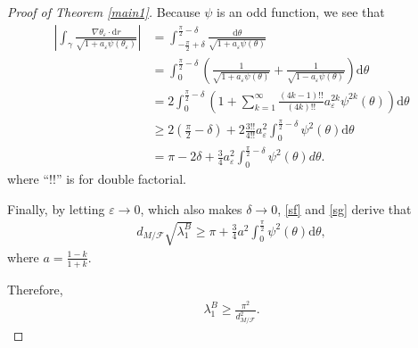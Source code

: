 \documentclass[10pt,a4paper]{amsart}
\def\d{\mathrm{d}}
\begin{document}
\begin{proof}[Proof of Theorem \ref{main1}]
        Because $\psi$ is an odd function, we see that
        \begin{align}\label{sg}
            \left\vert\int_\gamma{\frac{\nabla\theta_\varepsilon\cdot \d r}{\sqrt{1+a_\varepsilon\psi(\theta_\varepsilon)}}}\right\vert&=\int_{-\frac{\pi}{2}+\delta}^{\frac{\pi}{2}-\delta}{\frac{\d\theta}{\sqrt{1+a_\varepsilon\psi(\theta)}}}\nonumber\\&=\int_{0}^{\frac{\pi}{2}-\delta
            }\left(\frac{1}{\sqrt{1+a_\varepsilon\psi(\theta)}}+\frac{1}{\sqrt{1-a_\varepsilon\psi(\theta)}}\right)\d\theta\nonumber\\&=2\int_0^{\frac{\pi}{2}-\delta}\left(1+\sum_{k=1}^{\infty}{\frac{(4k-1)!!}{(4k)!!}a_\varepsilon^{2k}\psi^{2k}(\theta)}\right)\d\theta\\&\geq 2\left(\frac{\pi}{2}-\delta\right)+2\frac{3!!}{4!!}a_\varepsilon^2\int_0^{\frac{\pi}{2}-\delta}\psi^2(\theta)\d\theta\nonumber\\&=\pi-2\delta+\frac{3}{4}a_\varepsilon^2\int_0^{\frac{\pi}{2}-\delta}\psi^2(\theta)d\theta\nonumber.
        \end{align}where ``$!!$'' is for double factorial.
        
        Finally, by letting $\varepsilon\to 0$, which also makes $\delta\to 0$, \ref{sf} and \ref{sg} derive that 
        \begin{align}\label{uu}
            d_{M/\mathcal{F}}\sqrt{\lambda_1^B}\geq \pi+\frac{3}{4}a^2\int_0^{\frac{\pi}{2}}\psi^2(\theta)\d\theta,
        \end{align}where $a=\frac{1-k}{1+k}$.
        
        Therefore,
        \begin{align*}
            \lambda_1^B\geq\frac{\pi^2}{d_{M/\mathcal{F}}^2}.
        \end{align*}

       

        
\end{proof}
\end{document}
